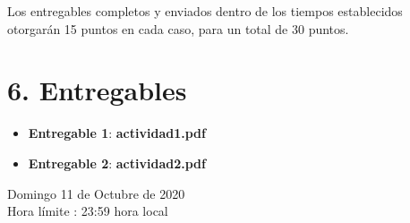 \documentclass[base=hide,11pt]{elegantbook}
\begin{document}
Los entregables completos y enviados dentro de los tiempos establecidos  otorgarán 15 puntos en cada caso, para un  total de 30 puntos. 



\section*{6. Entregables}

\begin{itemize}
\item {\bf Entregable 1}:   \textcolor{col4}{\bf actividad1.pdf } 
\item {\bf Entregable 2}:   \textcolor{col4}{\bf actividad2.pdf } 
\end{itemize}
\vspace{1cm}

Domingo 11 de Octubre de 2020\\
Hora límite : 23:59  hora  local\\


\end{document}
